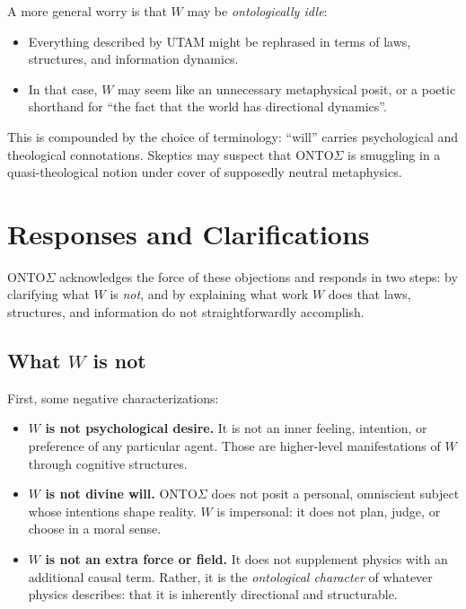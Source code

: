 \documentclass[12pt,a4paper]{report}
\newcommand{\Will}{W}
\begin{document}
A more general worry is that \(\Will\) may be \emph{ontologically idle}:

\begin{itemize}[leftmargin=2em]
    \item Everything described by UTAM might be rephrased in terms of laws, structures, and information dynamics.
    \item In that case, \(\Will\) may seem like an unnecessary metaphysical posit, or a poetic shorthand for ``the fact that the world has directional dynamics''.
\end{itemize}

This is compounded by the choice of terminology: ``will'' carries psychological and theological connotations. Skeptics may suspect that ONTO$\Sigma$ is smuggling in a quasi-theological notion under cover of supposedly neutral metaphysics.

\section{Responses and Clarifications}

ONTO$\Sigma$ acknowledges the force of these objections and responds in two steps: by clarifying what \(\Will\) is \emph{not}, and by explaining what work \(\Will\) does that laws, structures, and information do not straightforwardly accomplish.

\subsection*{What \texorpdfstring{$W$}{W} is not}

First, some negative characterizations:

\begin{itemize}[leftmargin=2em]
    \item \textbf{\(\Will\) is not psychological desire.} It is not an inner feeling, intention, or preference of any particular agent. Those are higher-level manifestations of \(\Will\) through cognitive structures.
    \item \textbf{\(\Will\) is not divine will.} ONTO$\Sigma$ does not posit a personal, omniscient subject whose intentions shape reality. \(\Will\) is impersonal: it does not plan, judge, or choose in a moral sense.
    \item \textbf{\(\Will\) is not an extra force or field.} It does not supplement physics with an additional causal term. Rather, it is the \emph{ontological character} of whatever physics describes: that it is inherently directional and structurable.
\end{itemize}
\end{document}
